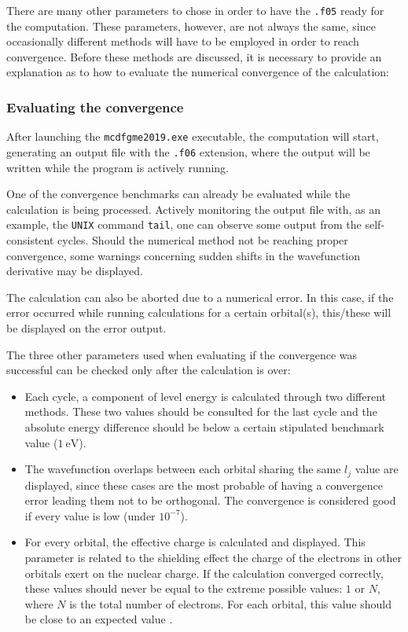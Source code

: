 There are many other parameters to chose in order to have the \verb|.f05| ready for the computation. These parameters, however, are not always the same, since occasionally different methods will have to be employed in order to reach convergence. Before these methods are discussed, it is necessary to provide an explanation as to how to evaluate the numerical convergence of the calculation:

\subsubsection{Evaluating the convergence}
After launching the \verb|mcdfgme2019.exe| executable, the computation will start, generating an output file with the \verb|.f06| extension, where the output will be written while the program is actively running.

One of the convergence benchmarks can already be evaluated while the calculation is being processed. Actively monitoring the output file with, as an example, the \verb|UNIX| command \verb|tail|, one can observe some output from the self-consistent cycles. Should the numerical method not be reaching proper convergence, some warnings concerning sudden shifts in the wavefunction derivative may be displayed.

The calculation can also be aborted due to a numerical error. In this case, if the error occurred while running calculations for a certain orbital(s), this/these will be displayed on the error output. 

The three other parameters used when evaluating if the convergence was successful can be checked only after the calculation is over:

\begin{itemize}
    \item Each cycle, a component of level energy is calculated through two different methods. These two values should be consulted for the last cycle and the absolute energy difference should be below a certain stipulated benchmark value ($1\ \si{\electronvolt}$).
    \item The wavefunction overlaps between each orbital sharing the same $l_j$ value are displayed, since these cases are the most probable of having a convergence error leading them not to be orthogonal. The convergence is considered good if every value is low (under $10^{-7}$).
    \item For every orbital, the effective charge is calculated and displayed. This parameter is related to the shielding effect the charge of the electrons in other orbitals exert on the nuclear charge. If the calculation converged correctly, these values should never be equal to the extreme possible values: $1$ or $N$, where $N$ is the total number of electrons. For each orbital, this value should be close to an expected value .
\end{itemize}





